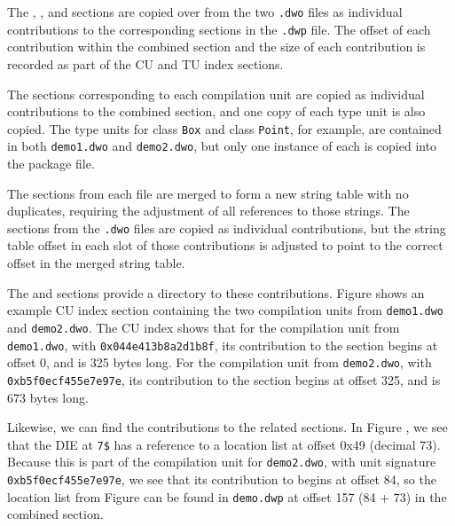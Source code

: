 The \dotdebugabbrevdwo{}, 
\bb
\dotdebugrnglistsdwo{}, 
\eb
\dotdebugloclistsdwo{} and \dotdebuglinedwo{}
sections are copied over from the two \texttt{.dwo} files as
individual contributions to the corresponding sections in the
\texttt{.dwp} file. 
The offset of each contribution within 
the combined section and the size of each contribution is recorded
as part of the CU and TU index sections.

The \dotdebuginfodwo{} sections corresponding to each compilation 
unit are copied as individual contributions to the combined
\dotdebuginfodwo{} section, and one copy of each type unit 
is also copied. The type units for class \texttt{Box} and class 
\texttt{Point}, for example, are contained in both \texttt{demo1.dwo} 
and \texttt{demo2.dwo}, but only one instance of each is copied into 
the package file.

The \dotdebugstrdwo{} sections from each file are merged to
form a new string table with no duplicates, requiring the
adjustment of all references to those strings. The
\dotdebugstroffsetsdwo{} sections from the \texttt{.dwo} files 
are copied as individual contributions, but the string table offset
in each slot of those contributions is adjusted to point to
the correct offset in the merged string table.

The \dotdebugcuindex{} and \dotdebugtuindex{} sections provide a
directory to these contributions. 
Figure  shows an example CU
index section containing the two compilation units from 
\texttt{demo1.dwo} and \texttt{demo2.dwo}. The CU index shows that 
for the compilation unit from \texttt{demo1.dwo}, with \CUsignature{} 
\texttt{0x044e413b8a2d1b8f}, its contribution to the \dotdebuginfodwo{} 
section begins at offset 0, and is 325 bytes long. For the compilation 
unit from \texttt{demo2.dwo}, with \CUsignature{} 
\texttt{0xb5f0ecf455e7e97e}, its contribution to the \dotdebuginfodwo{}
section begins at offset 325, and is 673 bytes long.

Likewise, we can find the contributions to the related sections.
In Figure , 
we see that the \DWTAGvariable{} DIE at \texttt{7\$} has a
reference to a location list at offset 0x49 (decimal 73). Because
this is part of the compilation unit for \texttt{demo2.dwo}, with 
unit signature \texttt{0xb5f0ecf455e7e97e}, we see that its contribution 
to \dotdebugloclistsdwo{} begins at offset 84, so the location list from
Figure  
can be found in \texttt{demo.dwp} at offset 157 (84 + 73) in
the combined \dotdebugloclistsdwo{} section.

